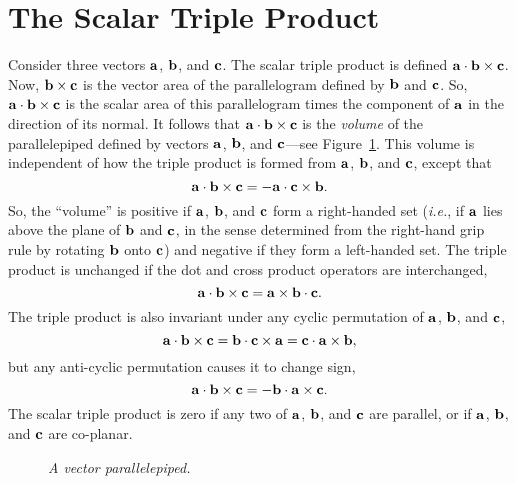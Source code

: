 \section{The Scalar Triple Product}
Consider three vectors ${\bf a}$, ${\bf b}$, and ${\bf c}$. The scalar triple product is
defined ${\bf a}\cdot {\bf b}\times {\bf c}$. Now, ${\bf b}\times {\bf c}$ is the vector area of
the parallelogram defined by ${\bf b}$ and ${\bf c}$. So, ${\bf a}\cdot {\bf b} \times{\bf c}$
is the scalar area of this parallelogram times the component of ${\bf a}$ in the direction
of its  normal. It follows that ${\bf a}\cdot {\bf b}\times{\bf c}$ is
the {\em volume} of the parallelepiped defined by vectors ${\bf a}$, ${\bf b}$, and ${\bf c}$---see Figure~\ref{f9a}.
This volume is independent of how the triple product is formed from ${\bf a}$, ${\bf b}$, 
and ${\bf c}$, except that 
\begin{equation}
{\bf a} \cdot {\bf b}\times{\bf c} = - {\bf a} \cdot {\bf c}\times{\bf b}.
\end{equation}
So, the ``volume'' is positive if ${\bf a}$, ${\bf b}$, and ${\bf c}$ form a right-handed set
({\em i.e.}, if ${\bf a}$ lies above the plane of ${\bf b}$ and ${\bf c}$,
in the sense determined from the right-hand grip rule by rotating
${\bf b}$ onto ${\bf c}$) and negative if they form a left-handed set. 
The triple product is unchanged if the dot and cross product operators are interchanged,
\begin{equation}
{\bf a} \cdot {\bf b}\times{\bf c} = {\bf a} \times{\bf b} \cdot{\bf c}.
\end{equation}
The triple product is also invariant under any cyclic permutation of ${\bf a}$, ${\bf b}$,
and ${\bf c}$,
\begin{equation}
{\bf a} \cdot {\bf b} \times{\bf c} = {\bf b} \cdot {\bf c} \times{\bf a} = 
{\bf c} \cdot {\bf a} \times{\bf b},
\end{equation}
but any anti-cyclic permutation causes it to change sign,
\begin{equation}
{\bf a} \cdot  {\bf b} \times{\bf c} = - {\bf b} \cdot {\bf a} \times{\bf c}.
\end{equation}
The scalar triple product is zero if any
two of ${\bf a}$, ${\bf b}$, and ${\bf c}$ are parallel, or if ${\bf a}$, ${\bf b}$, and ${\bf c}$
are co-planar. 
\begin{figure}
\epsfysize=1.5in
\centerline{}
\caption{\em A vector parallelepiped.}\label{f9a}
\end{figure}


